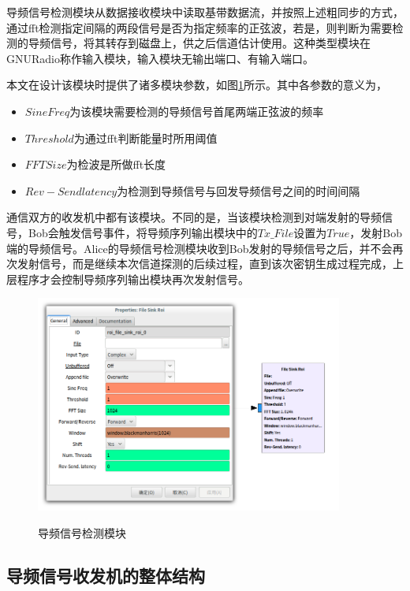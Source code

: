 \documentclass[master]{seuthesis} %
\begin{document}
\begin{Main}
导频信号检测模块从数据接收模块中读取基带数据流，并按照上述粗同步的方式，通过fft检测指定间隔的两段信号是否为指定频率的正弦波，若是，则判断为需要检测的导频信号，将其转存到磁盘上，供之后信道估计使用。这种类型模块在GNURadio称作输入模块，输入模块无输出端口、有输入端口。

本文在设计该模块时提供了诸多模块参数，如图\ref{file_sink_roi}所示。其中各参数的意义为，

\begin{itemize}
    \item $Sine Freq$为该模块需要检测的导频信号首尾两端正弦波的频率
    \item $Threshold$为通过fft判断能量时所用阈值
    \item $FFT Size$为检波是所做fft长度
    \item $Rev-Send latency$为检测到导频信号与回发导频信号之间的时间间隔
\end{itemize}

通信双方的收发机中都有该模块。不同的是，当该模块检测到对端发射的导频信号，Bob会触发信号事件，将导频序列输出模块中的$Tx\_File$设置为$True$，发射Bob端的导频信号。Alice的导频信号检测模块收到Bob发射的导频信号之后，并不会再次发射信号，而是继续本次信道探测的后续过程，直到该次密钥生成过程完成，上层程序才会控制导频序列输出模块再次发射信号。

\begin{figure}
    \centering
    \includegraphics[width=0.9\textwidth]{images/file_sink_roi}
    \caption{导频信号检测模块}{} 
    \label{file_sink_roi}
\end{figure}

\subsection{导频信号收发机的整体结构}


\end{Main}
\end{document}
